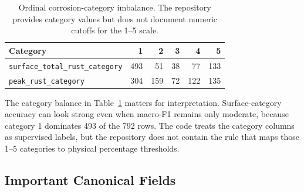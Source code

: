 \documentclass[11pt,a4paper]{article}
\begin{document}
\begin{table}[H]
\centering
\small
\begin{tabular}{lrrrrr}
\toprule
\textbf{Category} & \textbf{1} & \textbf{2} & \textbf{3} & \textbf{4} & \textbf{5} \\
\midrule
\texttt{surface\_total\_rust\_category} & 493 & 51 & 38 & 77 & 133 \\
\texttt{peak\_rust\_category} & 304 & 159 & 72 & 122 & 135 \\
\bottomrule
\end{tabular}
\caption{Ordinal corrosion-category imbalance. The repository provides category values but does not document numeric cutoffs for the 1--5 scale.}
\label{tab:category-balance}
\end{table}

The category balance in Table~\ref{tab:category-balance} matters for interpretation. Surface-category accuracy can look strong even when macro-F1 remains only moderate, because category 1 dominates 493 of the 792 rows. The code treats the category columns as supervised labels, but the repository does not contain the rule that maps those 1--5 categories to physical percentage thresholds.

\subsection{Important Canonical Fields}
\end{document}
